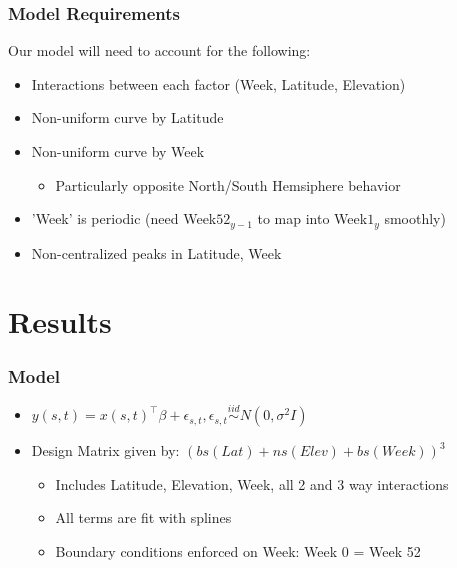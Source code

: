 \documentclass{beamer}
\begin{document}
    \begin{frame}
        \frametitle{Model Requirements}
        Our model will need to account for the following:
        \begin{itemize}
            \item Interactions between each factor (Week, Latitude, Elevation)
            \item Non-uniform curve by Latitude
            \item Non-uniform curve by Week
                \begin{itemize}
                    \item Particularly opposite North/South Hemsiphere behavior
                \end{itemize}
            \item 'Week' is periodic (need Week$52_{y-1}$ to map into Week$1_y$ smoothly)
            \item Non-centralized peaks in Latitude, Week
        \end{itemize}

    \end{frame}



\section{Results}
    \begin{frame}
        \frametitle{Model}
        \begin{itemize}
        \item $y(s, t) = x(s, t)^{\top}\beta + \epsilon_{s, t}, \epsilon_{s,t} \overset{iid}{\sim} N(0, \sigma^2I)$
        \item Design Matrix given by: $(bs(Lat) + ns(Elev) + bs(Week))^3$
            \begin{itemize}
                \item Includes Latitude, Elevation, Week, all 2 and 3 way interactions
                \item All terms are fit with splines
                \item Boundary conditions enforced on Week: Week 0 = Week 52
            \end{itemize}
        \end{itemize}
    \end{frame}
\end{document}
